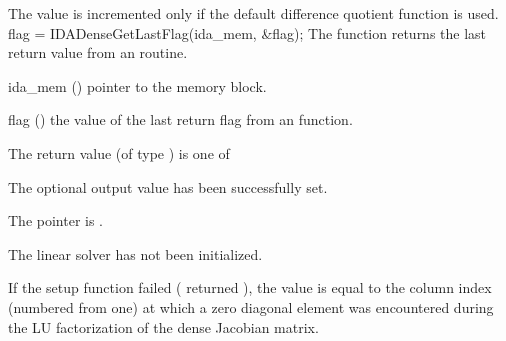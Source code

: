 {{}
{
  The value  is incremented only if the default 
   difference quotient function is used.
}
{
  flag = IDADenseGetLastFlag(ida\_mem, \&flag);
}
{
  The function  returns the
  last return value from an {\idadense} routine. 
}
{
  \begin{args}
  \item[ida\_mem] ()
    pointer to the {\ida} memory block.
  \item[flag] ()
    the value of the last return flag from an {\idadense} function.
  \end{args}
}
{
  The return value  (of type ) is one of
  \begin{args}
  \item[\Id{IDADENSE\_SUCCESS}] 
    The optional output value has been successfully set.
  \item[\Id{IDADENSE\_MEM\_NULL}]
    The  pointer is .
  \item[\Id{IDADENSE\_LMEM\_NULL}]
    The {\idadense} linear solver has not been initialized.
  \end{args}
}
{
  If the {\idadense} setup function failed ( returned
  ), the value  is equal to the column index
  (numbered from one) at which a zero diagonal element was encountered during
  the LU factorization of the dense Jacobian matrix.
}
%
%
}

